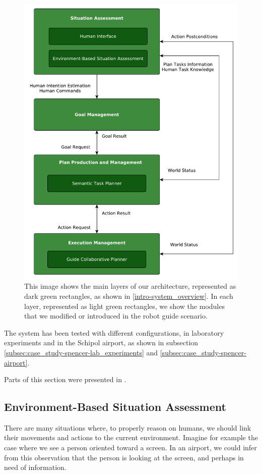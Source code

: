 \begin{figure}[ht!]
	\centering
	\includegraphics[scale=0.45]{img/case_study/spencer/architecture.pdf}
	\caption[Robot guide architecture]{This image shows the main layers of our architecture, represented as dark green rectangles, as shown in \ref{intro-system_overview}. In each layer, represented as light green rectangles, we show the modules that we modified or introduced in the robot guide scenario.}
	\label{fig:case_study-spencer-architecture}
\end{figure}

The system has been tested with different configurations, in laboratory experiments and in the Schipol airport, as shown in subsection \ref{subsec:case_study-spencer-lab_experiments} and \ref{subsec:case_study-spencer-airport}.

Parts of this section were presented in \cite{fiore2015adaptive}.

\subsection{Environment-Based Situation Assessment}
\label{subsec:case_study-spencer-intention}
There are many situations where, to properly reason on humans, we should link their movements and actions to the current environment. Imagine for example the case where we see a person oriented toward a screen. In an airport, we could infer from this observation that the person is looking at the screen, and perhaps in need of information. 

